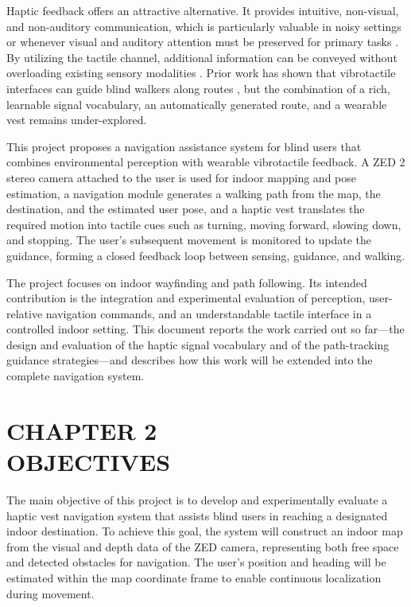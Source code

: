 \documentclass[12pt]{report}
\begin{document}
Haptic feedback offers an attractive alternative. It provides intuitive, non-visual, and non-auditory communication, which is particularly valuable in noisy settings or whenever visual and auditory attention must be preserved for primary tasks \cite{Rurenko2025sensing}. By utilizing the tactile channel, additional information can be conveyed without overloading existing sensory modalities \cite{Yan2013adesign}. Prior work has shown that vibrotactile interfaces can guide blind walkers along routes \cite{kammoun2012guiding, flores2015vibrotactile, marston2007nonvisual}, but the combination of a rich, learnable signal vocabulary, an automatically generated route, and a wearable vest remains under-explored.

This project proposes a navigation assistance system for blind users that combines environmental perception with wearable vibrotactile feedback. A ZED 2 stereo camera attached to the user is used for indoor mapping and pose estimation, a navigation module generates a walking path from the map, the destination, and the estimated user pose, and a haptic vest translates the required motion into tactile cues such as turning, moving forward, slowing down, and stopping. The user's subsequent movement is monitored to update the guidance, forming a closed feedback loop between sensing, guidance, and walking.

The project focuses on indoor wayfinding and path following. Its intended contribution is the integration and experimental evaluation of perception, user-relative navigation commands, and an understandable tactile interface in a controlled indoor setting. This document reports the work carried out so far---the design and evaluation of the haptic signal vocabulary and of the path-tracking guidance strategies---and describes how this work will be extended into the complete navigation system.

\chapter*{\centering CHAPTER 2\\[4pt]OBJECTIVES}
\thispagestyle{fancy}

The main objective of this project is to develop and experimentally evaluate a haptic vest navigation system that assists blind users in reaching a designated indoor destination. To achieve this goal, the system will construct an indoor map from the visual and depth data of the ZED camera, representing both free space and detected obstacles for navigation. The user's position and heading will be estimated within the map coordinate frame to enable continuous localization during movement.
\end{document}
